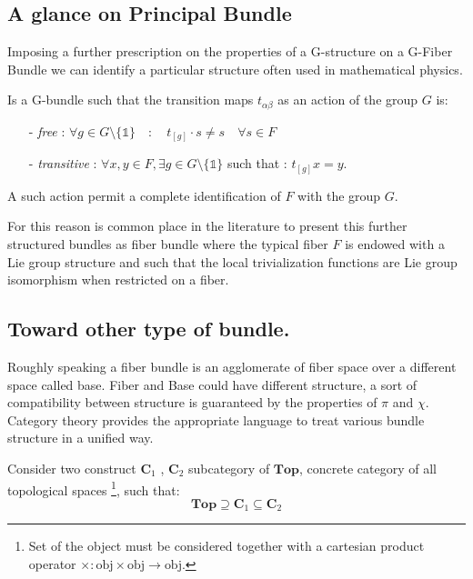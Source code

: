 \documentclass[a4paper,12pt]{scrartcl}    %
\begin{document}
\subsection{A glance on Principal Bundle}
Imposing a further prescription on the properties of a G-structure  on a G-Fiber Bundle we can identify a particular structure often used in mathematical physics.

\begin{definition}
Is a G-bundle such that the transition maps $t_{\alpha \beta}$ as an action of the group $G$ is:
\begin{itemize}
\item[-] \emph{free} : $ \forall g \in G\setminus \{\mathds{1} \} \quad : \quad t_{[g]} \cdot s \neq s \quad \forall s \in F$
\item[-] \emph{transitive} : $\forall x,y \in F , \exists g \in G \setminus \{\mathds{1} \}$ such that : $ t_{[g]} x = y$.
\end{itemize}
\end{definition}

\begin{observation}
A such action permit a complete identification of $F$ with the group $G$.

For this reason is common place in the literature to present this further structured bundles as fiber bundle where the typical fiber $F$ is endowed with a Lie group structure and such that the local trivialization functions are Lie group isomorphism when restricted on a fiber.
\end{observation}

\subsection{Toward other type of bundle.}
Roughly speaking a fiber bundle is an agglomerate of fiber space over a different space called base. Fiber and Base could have different structure, a sort of compatibility between structure is guaranteed by the properties of $\pi$ and $\chi$.
Category theory provides the appropriate language to treat various bundle structure in a unified way.

Consider two construct $\mathbf{C}_{1}$ , $\mathbf{C}_{2}$ subcategory of $\mathbf{Top}$, concrete category of all topological spaces \footnote{Set of the object must be considered together with a cartesian product operator $\times : \textrm{obj} \times \textrm{obj} \rightarrow \textrm{obj}$.}, such that:
\begin{displaymath}
\mathbf{Top} \supseteq \mathbf{C}_{1} \subseteq \mathbf{C}_{2}
\end{displaymath}
\end{document}
